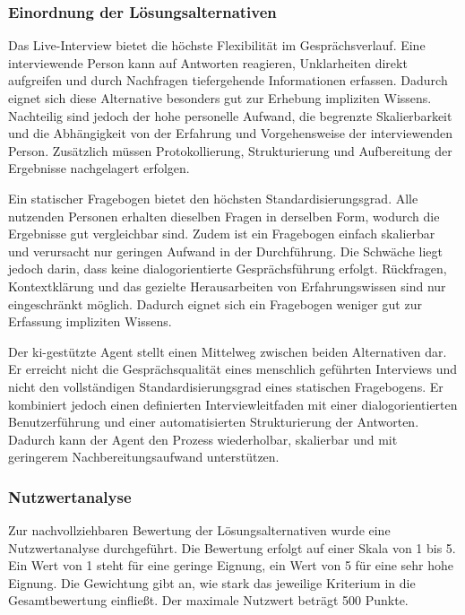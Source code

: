 \documentclass[
  10pt,
  ngerman,
  a4paper,
  toc=graduated,
  numbers=noenddot,
  headings=standardclasses,
  nonumberlist
]{scrartcl}
\begin{document}
\subsubsection{Einordnung der Lösungsalternativen}
\label{einordnung_der_lösungsalternativen}

Das Live-Interview bietet die höchste Flexibilität im Gesprächsverlauf. Eine interviewende Person kann auf Antworten reagieren, Unklarheiten direkt aufgreifen und durch Nachfragen tiefergehende Informationen erfassen. Dadurch eignet sich diese Alternative besonders gut zur Erhebung impliziten Wissens. Nachteilig sind jedoch der hohe personelle Aufwand, die begrenzte Skalierbarkeit und die Abhängigkeit von der Erfahrung und Vorgehensweise der interviewenden Person. Zusätzlich müssen Protokollierung, Strukturierung und Aufbereitung der Ergebnisse nachgelagert erfolgen.

Ein statischer Fragebogen bietet den höchsten Standardisierungsgrad. Alle nutzenden Personen erhalten dieselben Fragen in derselben Form, wodurch die Ergebnisse gut vergleichbar sind. Zudem ist ein Fragebogen einfach skalierbar und verursacht nur geringen Aufwand in der Durchführung. Die Schwäche liegt jedoch darin, dass keine dialogorientierte Gesprächsführung erfolgt. Rückfragen, Kontextklärung und das gezielte Herausarbeiten von Erfahrungswissen sind nur eingeschränkt möglich. Dadurch eignet sich ein Fragebogen weniger gut zur Erfassung impliziten Wissens.

Der \gls{ki}-gestützte Agent stellt einen Mittelweg zwischen beiden Alternativen dar. Er erreicht nicht die Gesprächsqualität eines menschlich geführten Interviews und nicht den vollständigen Standardisierungsgrad eines statischen Fragebogens. Er kombiniert jedoch einen definierten Interviewleitfaden mit einer dialogorientierten Benutzerführung und einer automatisierten Strukturierung der Antworten. Dadurch kann der Agent den Prozess wiederholbar, skalierbar und mit geringerem Nachbereitungsaufwand unterstützen.

\subsubsection{Nutzwertanalyse}
\label{nutzwertanalyse}

Zur nachvollziehbaren Bewertung der Lösungsalternativen wurde eine Nutzwertanalyse durchgeführt. Die Bewertung erfolgt auf einer Skala von 1 bis 5. Ein Wert von 1 steht für eine geringe Eignung, ein Wert von 5 für eine sehr hohe Eignung. Die Gewichtung gibt an, wie stark das jeweilige Kriterium in die Gesamtbewertung einfließt. Der maximale Nutzwert beträgt 500 Punkte.
\end{document}
